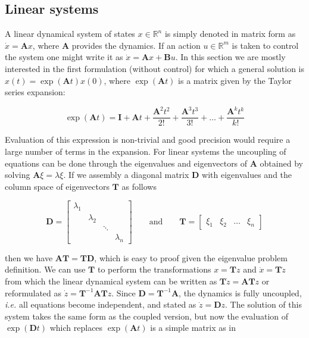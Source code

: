 \subsection{Linear systems}

A linear dynamical system of states $x\in\mathbb{R}^{n}$ is simply denoted in matrix form as $\dot{x}=\mathbf{A}x$, where $\mathbf{A}$ provides the dynamics. If an action $u\in\mathbb{R}^{m}$ is taken to control the system one might write it as $\dot{x}=\mathbf{A}x+\mathbf{B}u$. In this section we are mostly interested in the first formulation (without control) for which a general solution is $x(t)=\exp(\mathbf{A}t)x(0)$, where $\exp(\mathbf{A}t)$ is a matrix given by the Taylor series expansion:

\begin{equation}
\exp(\mathbf{A}t)=\mathbf{I}+\mathbf{A}t+\frac{\mathbf{A}^2t^2}{2!}+\frac{\mathbf{A}^3t^3}{3!}+\dots+\frac{\mathbf{A}^kt^k}{k!}
\end{equation}

Evaluation of this expression is non-trivial and good precision would require a large number of terms in the expansion. For linear systems the uncoupling of equations can be done through the eigenvalues and eigenvectors of $\mathbf{A}$ obtained by solving $\mathbf{A}\xi=\lambda\xi$. If we assembly a diagonal matrix $\mathbf{D}$ with eigenvalues and the column space of eigenvectors $\mathbf{T}$ as follows

\begin{equation}
\mathbf{D}=
\begin{bmatrix}
\lambda_{1} & & & \\
& \lambda_{2} & & \\ 
& & \ddots & \\
& & & \lambda_{n}
\end{bmatrix}
\qquad\text{and}\qquad
\mathbf{T}=
\begin{bmatrix}
\xi_{1} & \xi_{2} & \dots & \xi_{n}
\end{bmatrix}
\end{equation}

\noindent{}then we have $\mathbf{A}\mathbf{T}=\mathbf{T}\mathbf{D}$, which is easy to proof given the eigenvalue problem definition. We can use $\mathbf{T}$ to perform the transformations $x=\mathbf{T}z$ and $\dot{x}=\mathbf{T}\dot{z}$ from which the linear dynamical system can be written as $\mathbf{T}\dot{z}=\mathbf{A}\mathbf{T}z$ or reformulated as $\dot{z}=\mathbf{T}^{-1}\mathbf{A}\mathbf{T}z$. Since $\mathbf{D}=\mathbf{T}^{-1}\mathbf{A}$, the dynamics is fully uncoupled, \emph{i.e.} all equations become independent, and stated as $\dot{z}=\mathbf{D}z$. The solution of this system takes the same form as the coupled version, but now the evaluation of $\exp(\mathbf{D}t)$ which replaces $\exp(\mathbf{A}t)$ is a simple matrix as in

